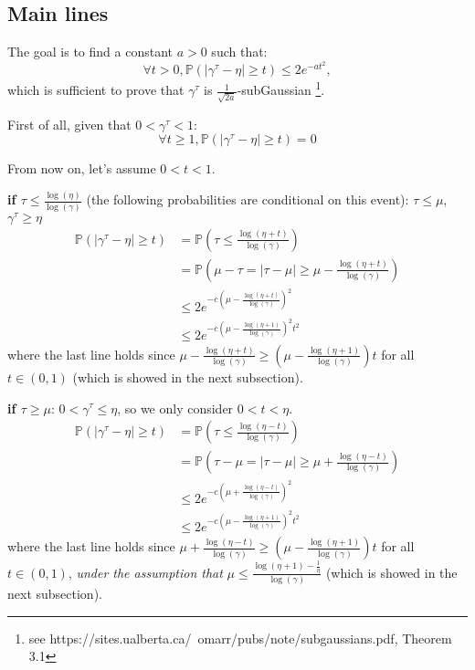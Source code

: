 \documentclass{article}
\begin{document}
\subsection{Main lines}

The goal is to find a constant $a>0$ such that:
$$\forall t>0, \mathbb{P}(|\gamma^\tau - \eta| \geq t) \leq 2e^{-a t^2},$$
which is sufficient to prove that $\gamma^\tau$ is $\frac{1}{\sqrt{2a}}$-subGaussian \footnote{see https://sites.ualberta.ca/~omarr/pubs/note/subgaussians.pdf, Theorem 3.1}.

First of all, given that $0 < \gamma^\tau < 1$:
$$\forall t \geq 1, \mathbb{P}(|\gamma^\tau - \eta| \geq t) = 0$$

From now on, let's assume $0 < t < 1$.

\textbf{if $\tau \leq \frac{\log(\eta)}{\log(\gamma)}$} (the following probabilities are conditional on this event):
$\tau \leq \mu$, $\gamma^\tau \geq \eta$
\begin{align}
  \mathbb{P}(|\gamma^\tau - \eta | \geq t) &= \mathbb{P}(\tau \leq \frac{\log(\eta + t)}{\log(\gamma)})\\
  &= \mathbb{P}(\mu - \tau = |\tau - \mu| \geq \mu - \frac{\log(\eta + t)}{\log(\gamma)})\\
  &\leq 2 e^{-c(\mu - \frac{\log(\eta + t)}{\log(\gamma)})^2}\\
  &\leq 2 e^{-c(\mu - \frac{\log(\eta + 1)}{\log(\gamma)})^2 t^2}
\end{align}
where the last line holds since $\mu - \frac{\log(\eta + t)}{\log(\gamma)} \geq (\mu - \frac{\log(\eta + 1)}{\log(\gamma)})t$ for all $t \in (0, 1)$ (which is showed in the next subsection).

\textbf{if $\tau \geq \mu$}:
$0 < \gamma^\tau \leq \eta$, so we only consider $0 < t < \eta$.
\begin{align}
  \mathbb{P}(|\gamma^\tau - \eta | \geq t) &= \mathbb{P}(\tau \leq \frac{\log(\eta - t)}{\log(\gamma)})\\
  &= \mathbb{P}(\tau - \mu = |\tau - \mu| \geq \mu + \frac{\log(\eta - t)}{\log(\gamma)})\\
  &\leq 2 e^{-c(\mu + \frac{\log(\eta - t)}{\log(\gamma)})^2}\\
  &\leq 2 e^{-c(\mu - \frac{\log(\eta + 1)}{\log(\gamma)})^2 t^2}
\end{align}
where the last line holds since $\mu + \frac{\log(\eta - t)}{\log(\gamma)} \geq (\mu - \frac{\log(\eta + 1)}{\log(\gamma)})t$ for all $t \in (0, 1)$, \textit{under the assumption that} $\mu \leq \frac{\log(\eta + 1) - \frac{1}{\eta}}{\log(\gamma)}$ (which is showed in the next subsection).
\end{document}
